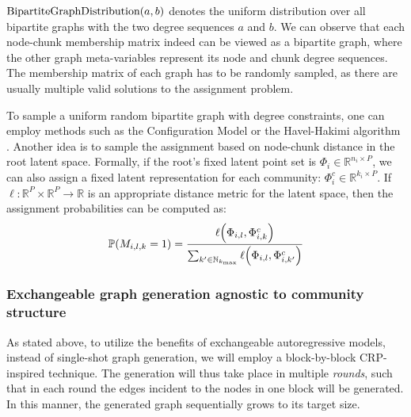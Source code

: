 $\text{BipartiteGraphDistribution}\mathopen{}\left(a,b\right)$ denotes the uniform distribution over all bipartite graphs with the two degree sequences $a$ and $b$. We can observe that each node-chunk membership matrix indeed can be viewed as a bipartite graph, where the other graph meta-variables represent its node and chunk degree sequences. The membership matrix of each graph has to be randomly sampled, as there are usually multiple valid solutions to the assignment problem. 
    
To sample a uniform random bipartite graph with degree constraints, one can employ methods such as the Configuration Model \cite{newman_structure_2003} or the Havel-Hakimi algorithm \cite{hakimi_realizability_1963, kleitman_algorithms_1973}. Another idea is to sample the assignment based on node-chunk distance in the root latent space. Formally, if the root's fixed latent point set is $\Phi_i \in \mathbb{R}^{n_i \times P}$, we can also assign a fixed latent representation for each community: $\Phi^c_i \in \mathbb{R}^{k_i \times P}$. If $\ell: \mathbb{R}^{P} \times \mathbb{R}^{P} \to \mathbb{R}$ is an appropriate distance metric for the latent space, then the assignment probabilities can be computed as: 
\begin{equation}
\mathbb{P}\mathopen{}\left(M_{i,l,k}=1\right)=\frac{\ell\mathopen{}\left(\Phi_{i,l},\Phi^c_{i,k}\right)}{\sum_{k' \in \mathbb{N}_{k_{\max}}}{\ell\mathopen{}\left(\Phi_{i,l},\Phi^c_{i,k'}\right)}}
\end{equation}

\subsubsection{Exchangeable graph generation agnostic to community structure}
As stated above, to utilize the benefits of exchangeable autoregressive models, instead of single-shot graph generation, we will employ a block-by-block CRP-inspired technique. The generation will thus take place in multiple \emph{rounds}, such that in each round the edges incident to the nodes in one block will be generated. In this manner, the generated graph sequentially grows to its target size.

